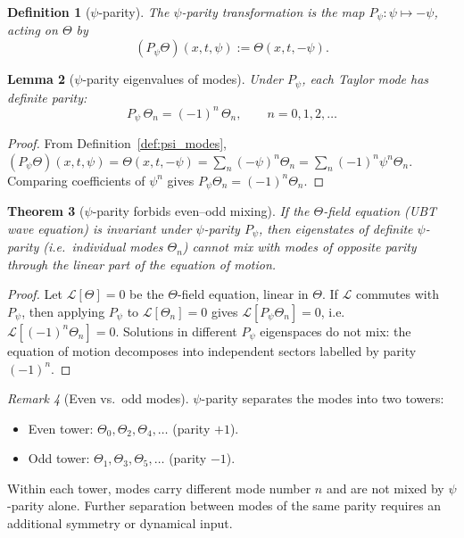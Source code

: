 \documentclass[12pt,a4paper]{article}
\newtheorem{theorem}{Theorem}[section]
\newtheorem{lemma}[theorem]{Lemma}
\newtheorem{definition}[theorem]{Definition}
\theoremstyle{remark}
\newtheorem{remark}[theorem]{Remark}
\begin{document}
\begin{definition}[$\psi$-parity]
  \label{def:psi_parity}
  The \emph{$\psi$-parity transformation} is the map
  $P_\psi : \psi \mapsto -\psi$, acting on $\Theta$ by
  \[
    (P_\psi \Theta)(x,t,\psi) := \Theta(x,t,-\psi).
  \]
\end{definition}

\begin{lemma}[$\psi$-parity eigenvalues of modes]
  \label{lem:parity_eigenvalues}
  Under $P_\psi$, each Taylor mode has definite parity:
  \[
    P_\psi\,\Theta_n = (-1)^n\,\Theta_n,
    \qquad n = 0, 1, 2, \ldots
  \]
\end{lemma}

\begin{proof}
  From Definition~\ref{def:psi_modes},
  $(P_\psi\Theta)(x,t,\psi) = \Theta(x,t,-\psi) =
  \sum_n (-\psi)^n\Theta_n = \sum_n (-1)^n\psi^n\Theta_n$.
  Comparing coefficients of $\psi^n$ gives $P_\psi\Theta_n = (-1)^n\Theta_n$.
\end{proof}

\begin{theorem}[$\psi$-parity forbids even--odd mixing]
  \label{thm:no_mixing}
  If the $\Theta$-field equation (UBT wave equation) is invariant under
  $\psi$-parity $P_\psi$, then eigenstates of definite $\psi$-parity
  (i.e.\ individual modes $\Theta_n$) cannot mix with modes of opposite parity
  through the linear part of the equation of motion.
\end{theorem}

\begin{proof}
  Let $\mathcal{L}[\Theta] = 0$ be the $\Theta$-field equation, linear in
  $\Theta$.  If $\mathcal{L}$ commutes with $P_\psi$, then applying $P_\psi$
  to $\mathcal{L}[\Theta_n] = 0$ gives $\mathcal{L}[P_\psi\Theta_n] = 0$,
  i.e.\ $\mathcal{L}[(-1)^n\Theta_n] = 0$.  Solutions in different $P_\psi$
  eigenspaces do not mix: the equation of motion decomposes into independent
  sectors labelled by parity $(-1)^n$.
\end{proof}

\begin{remark}[Even vs.\ odd modes]
  $\psi$-parity separates the modes into two towers:
  \begin{itemize}
    \item Even tower: $\Theta_0, \Theta_2, \Theta_4, \ldots$ (parity $+1$).
    \item Odd tower: $\Theta_1, \Theta_3, \Theta_5, \ldots$ (parity $-1$).
  \end{itemize}
  Within each tower, modes carry different mode number $n$ and are not mixed
  by $\psi$-parity alone.  Further separation between modes of the same parity
  requires an additional symmetry or dynamical input.
\end{remark}
\end{document}
